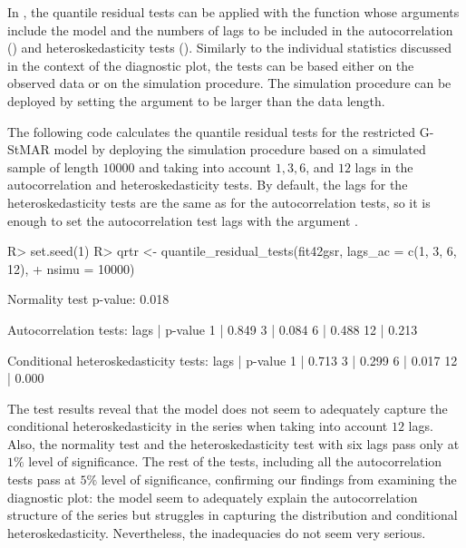 \documentclass[nojss]{jss} %
\begin{document}
In , the quantile residual tests can be applied with the function  whose arguments include the model and the numbers of lags to be included in the autocorrelation () and heteroskedasticity tests  (). Similarly to the individual statistics discussed in the context of the diagnostic plot, the tests can be based either on the observed data or on the simulation procedure. The simulation procedure can be deployed by setting the argument  to be larger than the data length.

The following code calculates the quantile residual tests for the restricted G-StMAR model  by deploying the simulation procedure based on a simulated sample of length $10000$ and taking into account $1,3,6$, and $12$ lags in the autocorrelation and heteroskedasticity tests. By default, the lags for the heteroskedasticity tests are the same as for the autocorrelation tests, so it is enough to set the autocorrelation test lags with the argument .
%
\begin{CodeChunk}
\begin{CodeInput}
R> set.seed(1)
R> qrtr <- quantile_residual_tests(fit42gsr, lags_ac = c(1, 3, 6, 12),
+    nsimu = 10000)
\end{CodeInput}
\begin{CodeOutput}
Normality test p-value: 0.018

Autocorrelation tests:
lags | p-value
  1  |  0.849
  3  |  0.084
  6  |  0.488
  12 |  0.213

Conditional heteroskedasticity tests:
lags | p-value
  1  |  0.713
  3  |  0.299
  6  |  0.017
  12 |  0.000
\end{CodeOutput}
\end{CodeChunk}
%
The test results reveal that the model does not seem to adequately capture the conditional heteroskedasticity in the series when taking into account $12$ lags. Also, the normality test and the heteroskedasticity test with six lags pass only at $1\%$ level of significance. The rest of the tests, including all the autocorrelation tests pass at $5\%$ level of significance, confirming our findings from examining the diagnostic plot: the model seem to adequately explain the autocorrelation structure of the series but struggles in capturing the distribution and conditional heteroskedasticity. Nevertheless, the inadequacies do not seem very serious.
\end{document}
